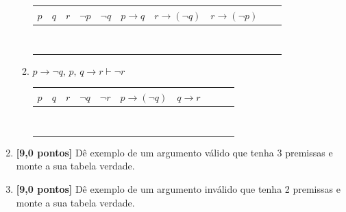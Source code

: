 \documentclass[12pt,a4paper]{article}
\begin{document}
\begin{enumerate}
\begin{enumerate}
  \begin{center}
    \begin{tabular}{|c|c|c|c|c|c|c|c|c|c|}
      \hline
      $p$ & $q$ & $r$ & $\lnot p$ & $\lnot q$ & 
      $p \rightarrow q$ & $r \rightarrow (\lnot q)$ & 
      $r \rightarrow (\lnot p)$\\ \hline
       & & & & & & & \\ \hline
       & & & & & & & \\ \hline
       & & & & & & & \\ \hline
       & & & & & & & \\ \hline
       & & & & & & & \\ \hline
       & & & & & & & \\ \hline
       & & & & & & & \\ \hline
       & & & & & & & \\ \hline
    \end{tabular}
  \end{center}

    \item $p\to \lnot q,\, p,\, q\to r \vdash \lnot r$

  \begin{center}
    \begin{tabular}{|c|c|c|c|c|c|c|c|c|c|}
      \hline
      $p$ & $q$ & $r$ & $\lnot q$ & $\lnot r$ & 
      $p \rightarrow (\lnot q)$ & $q \rightarrow r$ \\ \hline
       & & & & & & \\ \hline
       & & & & & & \\ \hline
       & & & & & & \\ \hline
       & & & & & & \\ \hline
       & & & & & & \\ \hline
       & & & & & & \\ \hline
       & & & & & & \\ \hline
       & & & & & & \\ \hline
    \end{tabular}
  \end{center}

  \end{enumerate}
  
  \item \textbf{[9,0 pontos]}  Dê exemplo de um argumento válido que tenha 3 premissas 
  e monte a sua tabela verdade.

   \vspace{7cm}
   
  \item \textbf{[9,0 pontos]} Dê exemplo de um argumento inválido que tenha 2 premissas 
  e monte a sua tabela verdade.

   
\end{enumerate}
\end{document}
